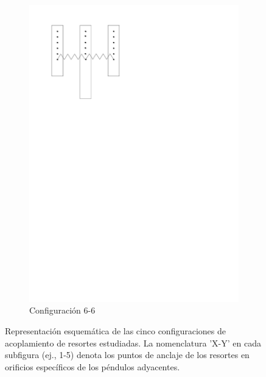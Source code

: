 \begin{figure}[htbp!]
\begin{subfigure}[b]{0.3\textwidth}
		\includegraphics[width=\linewidth]{./Figures/66.pdf}
		\caption{Configuración 6-6}
		\label{fig:conf-6-6}
	\end{subfigure}

	\caption{Representación esquemática de las cinco configuraciones de
		acoplamiento de resortes estudiadas. La nomenclatura 'X-Y' en cada
		subfigura (ej., 1-5) denota los puntos de anclaje de los resortes
	en orificios específicos de los péndulos adyacentes.}
	\label{fig:configs}
\end{figure}
